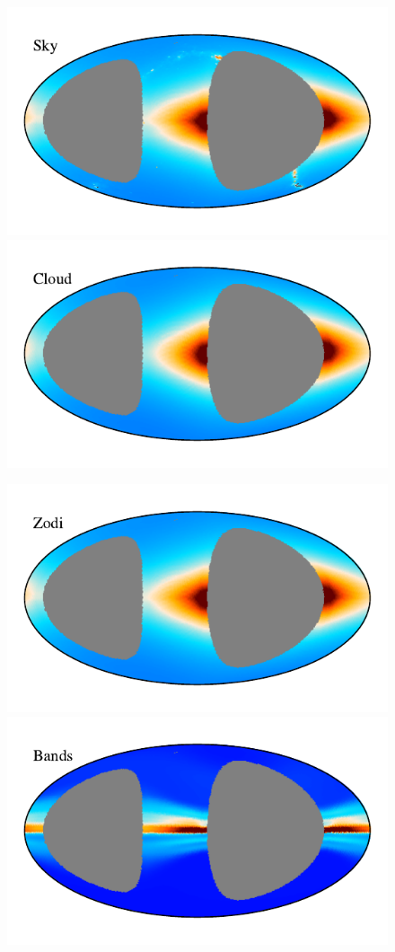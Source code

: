 \documentclass{aa}
\begin{document}
\begin{figure}
\centering
\includegraphics[width=0.9\columnwidth]{figs/zodi_comps/zodi_sky_98_week.pdf}\includegraphics[width=0.9\columnwidth]{figs/zodi_comps/zodi_cloud_98_week.pdf}
\vspace{-0.6cm}

\includegraphics[width=0.9\columnwidth]{figs/zodi_comps/zodi_zodi_98_week.pdf}\includegraphics[width=0.9\columnwidth]{figs/zodi_comps/zodi_bands_98_week.pdf}
\vspace{-0.6cm}


\end{figure}
\end{document}
